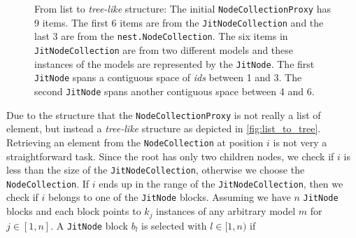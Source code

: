 \begin{figure}[ht!]
\begin{tikzpicture}[x=0.75pt,y=0.75pt,yscale=-1,xscale=1]
\end{tikzpicture}

    \caption{From list to \emph{tree-like} structure: The initial \texttt{NodeCollectionProxy} has 9 items. The first 6 items are from the \texttt{JitNodeCollection} and the last 3 are from the \texttt{nest.NodeCollection}. The six items  in \texttt{JitNodeCollection} are from two different models and these instances of the models are represented by the \texttt{JitNode}. The first \texttt{JitNode} spans a contiguous space of \emph{ids} between 1 and 3. The second \texttt{JitNode} spans another contiguous space between 4 and 6.}
    \label{fig:list_to_tree}
\end{figure}


Due to the structure that the \texttt{NodeCollectionProxy} is not really a list of element, but instead a \emph{tree-like} structure as depicted in \autoref{fig:list_to_tree}. Retrieving an element from the \texttt{NodeCollection} at position $i$ is not very a straightforward task. Since the root has only two children nodes, we check if $i$ is less than the size of the \texttt{JitNodeCollection}, otherwise we choose the \texttt{NodeCollection}. If $i$ ends up in the range of the \texttt{JitNodeCollection}, then we check if $i$ belongs to one of the \texttt{JitNode} blocks. Assuming we have $n$ \texttt{JitNode} blocks and each block points to $k_j$ instances of any arbitrary model $m$ for $j \in [1, n]$. A \texttt{JitNode} block  $b_l$ is selected with $ l \in [1, n)$ if

